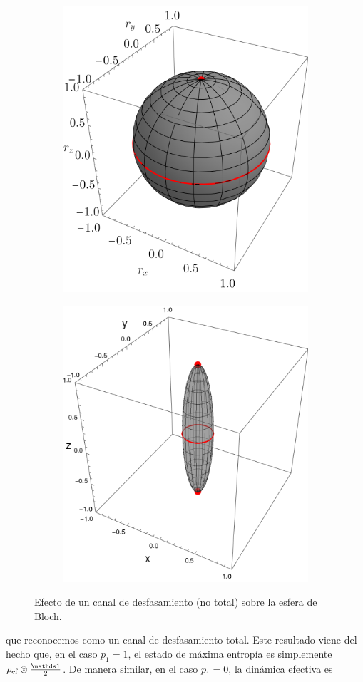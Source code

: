 \begin{figure}[ht!]
  \centering
  \begin{subfigure}{0.5\textwidth}
    \centering
    \includegraphics[width=0.6\linewidth]{chapter3/figures_toy/SWAP_t=0._p=0.9_r=0.9.png}
  \end{subfigure}%
  \begin{subfigure}{0.5\textwidth}
    \centering
    \includegraphics[width=0.6\linewidth]{chapter3/figures_toy/sphere_PF_t=1.0_z=0.8_p=0.6.png}
  \end{subfigure}
  \caption{Efecto de un canal de desfasamiento (no total) sobre la esfera de Bloch.}\label{fig:PhaseFlip}
\end{figure}
que reconocemos como un canal de desfasamiento total. Este resultado viene del hecho que, en el caso $p_{1}=1$, el estado de máxima entropía es simplemente $\rho_{\ef}\otimes\frac{\Id}{2}$. De manera similar, en el caso $p_{1}=0$, la dinámica efectiva es
